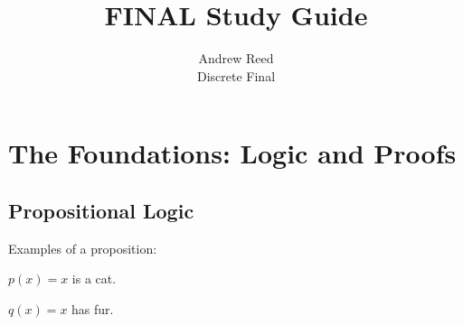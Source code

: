 \documentclass[12pt]{article}
\begin{document}
 
 
\title{FINAL Study Guide}%
\author{Andrew Reed\\ %
Discrete Final} %
 
\maketitle

\tableofcontents

\pagebreak

\quad

\quad

\section{The Foundations: Logic and Proofs}

\subsection{Propositional Logic}

Examples of a proposition:

$p(x) = x$ is a cat.

$q(x) = x$ has fur.
\end{document}
